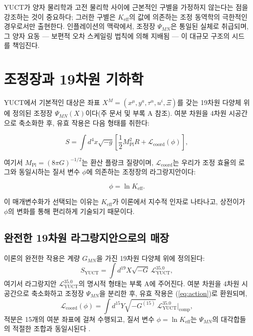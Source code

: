 \documentclass[11pt,a4paper]{article}
\newcommand{\Keff}{K_{\mathrm{eff}}}
\newcommand{\Mpl}{M_{\mathrm{Pl}}}
\begin{document}
	YUCT가 양자 물리학과 고전 물리학 사이에 근본적인 구별을 가정하지 않는다는 점을 강조하는 것이 중요하다; 그러한 구별은 \(K_{\mathrm{eff}}\)의 값에 의존하는 조정 동역학의 극한적인 경우로서만 출현한다. 인플레이션의 맥락에서, 조정장 \(\Psi_{MN}\)은 통일된 실체로 취급되며, 그 양자 요동 — 보편적 오차 스케일링 법칙에 의해 지배됨 — 이 대규모 구조의 시드를 책임진다.
	
	\section{조정장과 19차원 기하학}
	\label{sec:field}
	
	YUCT에서 기본적인 대상은 좌표 \(X^M = (x^\mu, y^a, \tau^\alpha, u^i, \Xi)\)를 갖는 19차원 다양체 위에 정의된 조정장 \(\Psi_{MN}(X)\)이다(주 문서 및 부록 A 참조). 여분 차원을 4차원 시공간으로 축소화한 후, 유효 작용은 다음 형태를 취한다:
	
	\begin{equation}
		S = \int d^4x \sqrt{-g} \left[ \frac{1}{2} \Mpl^2 R + \mathcal{L}_{\mathrm{coord}}(\phi) \right],
		\label{eq:action}
	\end{equation}
	
	여기서 \(\Mpl = (8\pi G)^{-1/2}\)는 환산 플랑크 질량이며, \(\mathcal{L}_{\mathrm{coord}}\)는 우리가 조정 효율의 로그와 동일시하는 질서 변수 \(\phi\)에 의존하는 조정장의 라그랑지안이다:
	
	\begin{equation}
		\phi = \ln \Keff.
		\label{eq:phi-def}
	\end{equation}
	
	이 매개변수화가 선택되는 이유는 \(\Keff\)가 이론에서 지수적 인자로 나타나고, 상전이가 \(\phi\)의 변화를 통해 편리하게 기술되기 때문이다.
	
	\subsection{완전한 19차원 라그랑지안으로의 매장}
	
	이론의 완전한 작용은 계량 \(G_{MN}\)을 가진 19차원 다양체 위에 정의된다:
	\begin{equation}
		S_{\text{YUCT}} = \int d^{19}X \sqrt{-G} \, \mathcal{L}_{\text{YUCT}}^{35.0},
		\label{eq:full-action}
	\end{equation}
	여기서 라그랑지안 \(\mathcal{L}_{\text{YUCT}}^{35.0}\)의 명시적 형태는 부록 A에 주어진다. 여분 차원을 4차원 시공간으로 축소화하고 조정장 \(\Psi_{MN}\)을 분리한 후, 유효 작용은 (\ref{eq:action})로 환원되며,
	\begin{equation}
		\mathcal{L}_{\mathrm{coord}}(\phi) = \int d^{15}Y \sqrt{-G^{(15)}} \, \mathcal{L}_{\text{YUCT}}^{35.0}\big|_{\text{comp}},
	\end{equation}
	적분은 15개의 여분 좌표에 걸쳐 수행되고, 질서 변수 \(\phi = \ln\Keff\)는 \(\Psi_{MN}\)의 대각합들의 적절한 조합과 동일시된다 \cite{Yakushev2026}.
	
\end{document}
